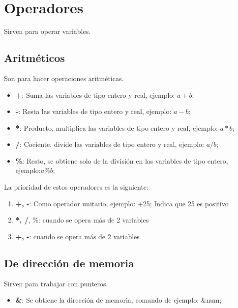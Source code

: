 \chapter[Operadores]{Operadores}
\raggedright
Sirven para operar variables.

\section [Aritméticos]{Aritméticos}
Son para hacer operaciones aritméticas.
\vspace{1em}
\begin{itemize}
	\item \textbf{+}: Suma las variables de tipo entero y real, ejemplo: {$a + b;$}
	\item \textbf{-}: Resta las variables de tipo entero y real, ejemplo: {$a - b;$}
	\item \textbf{*}: Producto, multiplica las variables de tipo entero y real, ejemplo: {$a * b;$}
	\item \textbf{/}: Cociente, divide las variables de tipo entero y real, ejemplo: {$a / b;$}
	\item \textbf{\%}: Resto, se obtiene solo de la división en las variables de tipo entero, ejemplo:{$a \% b;$}
\end{itemize}
La prioridad de estos operadores es la siguiente:
\begin{enumerate}
	\item \textbf{+, -}: Como operador unitario, ejemplo: +25; Indica que 25 es positivo
	\item {\textbf{*, /}, \%: cuando se opera más de 2 variables}
	\item \textbf{+, -}: cuando se opera más de 2 variables
\end{enumerate}

\section [De dirección de memoria]{De dirección de memoria}
Sirven para trabajar con punteros.
\vspace{1em}
\begin{itemize}
	\item \textbf{\&}: Se obtiene la dirección de memoria, comando de ejemplo: {\&num};
\end{itemize}

